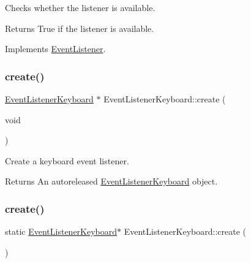 Checks whether the listener is available.

\begin{DoxyReturn}{Returns}
True if the listener is available. 
\end{DoxyReturn}


Implements \hyperlink{classEventListener_adf9e4eb37ea6e94c05f4d1b6594bd35e}{Event\+Listener}.

\mbox{\label{classEventListenerKeyboard_a1962de2a4fc33624a151427141cb5d7e}} 
\subsubsection{\texorpdfstring{create()}{create()}\hspace{0.1cm}{\footnotesize\ttfamily [1/2]}}
{\footnotesize\ttfamily \hyperlink{classEventListenerKeyboard}{Event\+Listener\+Keyboard} $\ast$ Event\+Listener\+Keyboard\+::create (\begin{DoxyParamCaption}\item[{void}]{ }\end{DoxyParamCaption})\hspace{0.3cm}{\ttfamily [static]}}

Create a keyboard event listener.

\begin{DoxyReturn}{Returns}
An autoreleased \hyperlink{classEventListenerKeyboard}{Event\+Listener\+Keyboard} object. 
\end{DoxyReturn}
\mbox{\label{classEventListenerKeyboard_a5d5328ee7886dc199940fce87de5488e}} 
\subsubsection{\texorpdfstring{create()}{create()}\hspace{0.1cm}{\footnotesize\ttfamily [2/2]}}
{\footnotesize\ttfamily static \hyperlink{classEventListenerKeyboard}{Event\+Listener\+Keyboard}$\ast$ Event\+Listener\+Keyboard\+::create (\begin{DoxyParamCaption}{ }\end{DoxyParamCaption})\hspace{0.3cm}{\ttfamily [static]}}

